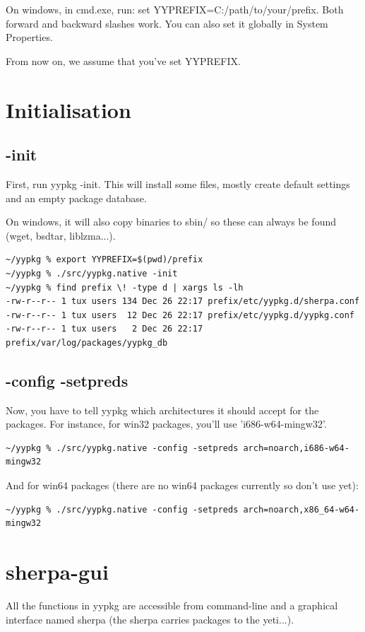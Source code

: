 \documentclass[a4paper]{article}
\begin{document}
On windows, in cmd.exe, run: set YYPREFIX=C:/path/to/your/prefix. Both forward and backward slashes work. You can also set it globally in System Properties.

From now on, we assume that you've set YYPREFIX.

\section{Initialisation}
\subsection{-init}
First, run yypkg -init. This will install some files, mostly create default settings and an empty package database.

On windows, it will also copy binaries to sbin/ so these can always be found (wget, bsdtar, liblzma...).

\begin{verbatim}
~/yypkg % export YYPREFIX=$(pwd)/prefix
~/yypkg % ./src/yypkg.native -init
~/yypkg % find prefix \! -type d | xargs ls -lh         
-rw-r--r-- 1 tux users 134 Dec 26 22:17 prefix/etc/yypkg.d/sherpa.conf
-rw-r--r-- 1 tux users  12 Dec 26 22:17 prefix/etc/yypkg.d/yypkg.conf
-rw-r--r-- 1 tux users   2 Dec 26 22:17 prefix/var/log/packages/yypkg_db
\end{verbatim}

\subsection{-config -setpreds}
Now, you have to tell yypkg which architectures it should accept for the packages. For instance, for win32 packages, you'll use 'i686-w64-mingw32'.
\begin{verbatim}
~/yypkg % ./src/yypkg.native -config -setpreds arch=noarch,i686-w64-mingw32
\end{verbatim}

And for win64 packages (there are no win64 packages currently so don't use yet):

\begin{verbatim}
~/yypkg % ./src/yypkg.native -config -setpreds arch=noarch,x86_64-w64-mingw32
\end{verbatim}

\section{sherpa-gui}
All the functions in yypkg are accessible from command-line and a graphical interface named sherpa (the sherpa carries packages to the yeti...).
\end{document}
